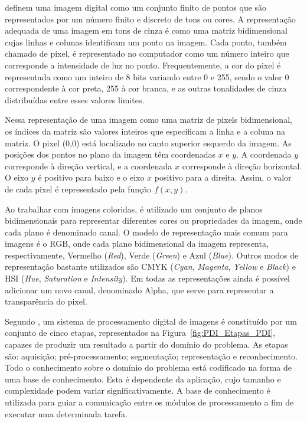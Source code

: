 \documentclass[12pt,oneside,a4paper,english,french,spanish,brazil,]{abntex2}
\begin{document}
\citet{conci:2003} definem uma imagem digital como um conjunto finito de pontos que são representados por um número finito e discreto de tons ou cores. A representação adequada de uma imagem em tons de cinza é como uma matriz bidimensional cujas linhas e colunas identificam um ponto na imagem. Cada ponto, também chamado de pixel, é representado no computador como um número inteiro que corresponde a intensidade de luz no ponto. Frequentemente, a cor do pixel é representada como um inteiro de 8 bits variando entre 0 e 255, sendo o valor 0 correspondente à cor preta, 255 à cor branca, e as outras tonalidades de cinza distribuídas entre esses valores limites.

Nessa representação de uma imagem como uma matriz de pixels bidimensional, os índices da matriz são valores inteiros que especificam a linha e a coluna na matriz. O pixel (0,0) está localizado no canto superior esquerdo da imagem. As posições dos pontos no plano da imagem têm coordenadas \(x\) e \(y\). A coordenada \(y\) corresponde à direção vertical, e a coordenada \(x\) corresponde à direção horizontal. O eixo \(y\) é positivo para baixo e o eixo \(x\) positivo para a direita. Assim, o valor de cada pixel é representado pela função \(f(x,y)\).

Ao trabalhar com imagens coloridas, é utilizado um conjunto de planos bidimensionais para representar diferentes cores ou propriedades da imagem, onde cada plano é denominado canal. O modelo de representação mais comum para imagens é o RGB, onde cada plano bidimensional da imagem representa, respectivamente, Vermelho (\textit{Red}), Verde (\textit{Green}) e Azul (\textit{Blue}). Outros modos de representação bastante utilizados são CMYK (\textit{Cyan}, \textit{Magenta}, \textit{Yellow} e \textit{Black}) e HSI (\textit{Hue}, \textit{Saturation} e \textit{Intensity}). Em todas as representações ainda é possível adicionar um novo canal, denominado Alpha, que serve para representar a transparência do pixel.

Segundo \citet{pedrini:2008}, um sistema de processamento digital de imagens é constituído por um conjunto de cinco etapas, representados na Figura~\ref{fig:PDI_Etapas_PDI}, capazes de produzir um resultado a partir do domínio do problema. As etapas são: aquisição; pré-processamento; segmentação; representação e reconhecimento. Todo o conhecimento sobre o domínio do problema está codificado na forma de uma base de conhecimento. Esta é dependente da aplicação, cujo tamanho e complexidade podem variar significativamente. A base de conhecimento é utilizada para guiar a comunicação entre os módulos de processamento a fim de executar uma determinada tarefa.
\end{document}
